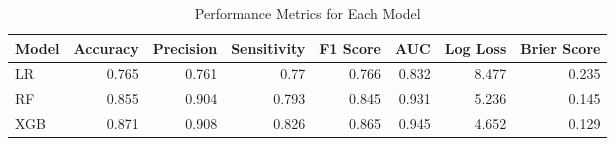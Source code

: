 \begin{table}[H]\centering
\caption{Performance Metrics for Each Model}
\label{Table 3 :performance_metrics}
\begin{tabular}{lrrrrrrr}
\toprule
Model & Accuracy & Precision & Sensitivity & F1 Score & AUC & Log Loss & Brier Score \\
\midrule
LR & 0.765 & 0.761 & 0.77 & 0.766 & 0.832 & 8.477 & 0.235 \\
RF & 0.855 & 0.904 & 0.793 & 0.845 & 0.931 & 5.236 & 0.145 \\
XGB & 0.871 & 0.908 & 0.826 & 0.865 & 0.945 & 4.652 & 0.129 \\
\bottomrule
\end{tabular}
\end{table}
